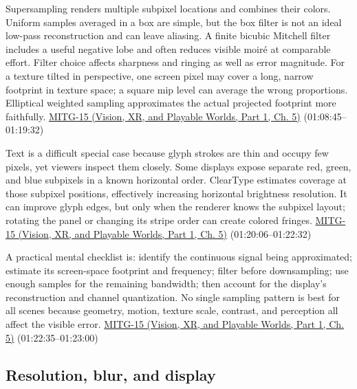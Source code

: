 Supersampling renders multiple subpixel locations and combines their colors. Uniform samples averaged in a box are simple, but the box filter is not an ideal low-pass reconstruction and can leave aliasing. A finite bicubic Mitchell filter includes a useful negative lobe and often reduces visible moiré at comparable effort. Filter choice affects sharpness and ringing as well as error magnitude. For a texture tilted in perspective, one screen pixel may cover a long, narrow footprint in texture space; a square mip level can average the wrong proportions. Elliptical weighted sampling approximates the actual projected footprint more faithfully. \href{../07-Vision-XR-and-Playable-Worlds-P01/main.pdf\#nameddest=04-visual-computing-ii-ch036-mitg-15---antialiasing}{MITG-15 (Vision, XR, and Playable Worlds, Part 1, Ch. 5)} (01:08:45--01:19:32)

Text is a difficult special case because glyph strokes are thin and occupy few pixels, yet viewers inspect them closely. Some displays expose separate red, green, and blue subpixels in a known horizontal order. ClearType estimates coverage at those subpixel positions, effectively increasing horizontal brightness resolution. It can improve glyph edges, but only when the renderer knows the subpixel layout; rotating the panel or changing its stripe order can create colored fringes. \href{../07-Vision-XR-and-Playable-Worlds-P01/main.pdf\#nameddest=04-visual-computing-ii-ch036-mitg-15---antialiasing}{MITG-15 (Vision, XR, and Playable Worlds, Part 1, Ch. 5)} (01:20:06--01:22:32)

A practical mental checklist is: identify the continuous signal being approximated; estimate its screen-space footprint and frequency; filter before downsampling; use enough samples for the remaining bandwidth; then account for the display's reconstruction and channel quantization. No single sampling pattern is best for all scenes because geometry, motion, texture scale, contrast, and perception all affect the visible error. \href{../07-Vision-XR-and-Playable-Worlds-P01/main.pdf\#nameddest=04-visual-computing-ii-ch036-mitg-15---antialiasing}{MITG-15 (Vision, XR, and Playable Worlds, Part 1, Ch. 5)} (01:22:35--01:23:00)

\subsection{Resolution, blur, and display}\label{03-visual-computing-i-ch004-resolution-blur-and-display}

\hypertarget{03-visual-computing-i-ch004-resolution-blur-and-display}{}

